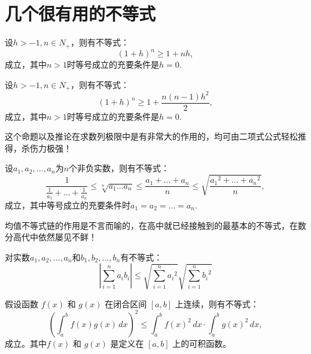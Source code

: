\section{几个很有用的不等式}

\begin{proposition}[Bernoulli不等式]
	设$h>-1,n\in N_+$，则有不等式：
	\begin{equation}
		(1+h)^n\geq 1+nh,
	\end{equation}		
	成立，其中$n>1$时等号成立的充要条件是$h=0$.
\end{proposition}

\begin{corollary}[对Bernoulli不等式的补充]
	设$h>-1,n\in N_+$，则有不等式：
	\begin{equation}
		(1+h)^n\geq 1+\dfrac{n(n-1)h^2}{2},
	\end{equation}
	成立，其中$n>1$时等号成立的充要条件是$h=0$.
\end{corollary}

这个命题以及推论在求数列极限中是有非常大的作用的，均可由二项式公式轻松推得，杀伤力极强！

\begin{proposition}[均值不等式]
	设$a_1,a_2,\dots,a_n$为$n$个非负实数，则有不等式：
	\begin{equation}
		\dfrac{1}{\frac{1}{a_1}+\dots+\frac{1}{a_n}}\leq\sqrt[n]{a_1\dots a_n}\leq\dfrac{a_1+\dots+a_n}{n}\leq\sqrt{\dfrac{{a_1}^2+\dots+{a_n}^2}{n}},
	\end{equation}
	成立，其中等号成立的充要条件时$a_1=a_2=\dots=a_n.$
\end{proposition}

均值不等式链的作用是不言而喻的，在高中就已经接触到的最基本的不等式，在数分高代中依然屡见不鲜！

\begin{proposition}
	对实数$a_1,a_2,\dots,a_n$和$b_1,b_2,\dots,b_n$有不等式：
	\begin{equation}
		\left|\displaystyle\sum_{i=1}^{n}a_ib_i\right|\leq\sqrt{\displaystyle\sum_{i=1}^{n}{a_i}^2}\sqrt{\displaystyle\sum_{i=1}^{n}{b_i}^2}
	\end{equation}
\end{proposition}

\begin{corollary}[柯西不等式积分形式]
	假设函数 $f(x)$ 和 $g(x)$ 在闭合区间 $[a, b]$ 上连续，则有不等式：
	\begin{equation}
		\left(\int_a^b f(x)g(x) \, dx\right)^2 \leq \int_a^b f(x)^2 \, dx \cdot \int_a^b g(x)^2 \, dx,
	\end{equation}
	成立。其中$f(x)$ 和 $g(x)$ 是定义在 $[a, b]$ 上的可积函数。
\end{corollary}

